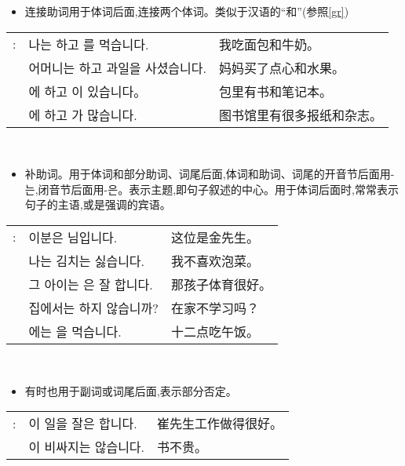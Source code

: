 \begin{grammar}
    \begin{grammarsect}[\kr -하고]
    \begin{itemize}
        \item 连接助词用于体词后面,连接两个体词。类似于汉语的“和”(参照\ref{gr})
    \end{itemize}
    \begin{tabular}{lll}
        \kr \ruby{例}{예}: &\kr 나는 \ruby{빵}{pão}하고 \ruby{牛乳}{우유}를 먹습니다.&我吃面包和牛奶。 \\
        &\kr 어머니는 \ruby{菓子}{과자}하고 과일을 사셨습니다. &妈妈买了点心和水果。\\ 
        &\kr \ruby{가방}{かばん}에 \ruby{冊}{책}하고 \ruby{空冊}{공책}이 있습니다。&包里有书和笔记本。\\
        &\kr \ruby{圖書館}{도서관}에 \ruby{新聞}{신문}하고 \ruby{雜誌}{잡지}가 많습니다.&图书馆里有很多报纸和杂志。\\
    \end{tabular}\\
    \end{grammarsect}
    \begin{grammarsect}[\kr -은/-는]
        \begin{itemize}
            \item 补助词。用于体词和部分助词、词尾后面,体词和助词、词尾的开音节后面用{\kr -는},闭音节后面用{\kr -은}。表示主题,即句子叙述的中心。用于体词后面时,常常表示句子的主语,或是强调的宾语。
        \end{itemize}
        \begin{tabular}{lll}
            \kr \ruby{例}{예}: &\kr 이분은 \ruby{金}{김} \ruby{先生}{선생}님입니다.&这位是金先生。\\
            &\kr 나는 김치는 싫습니다.&我不喜欢泡菜。\\
            &\kr 그 아이는 \ruby{運動}{운동}은 잘 합니다.&那孩子体育很好。\\
            &\kr 집에서는 \ruby{工夫}{공부}하지 않습니까?&在家不学习吗？\\
            &\kr \ruby{/2}{열두}\ruby{時}{시}에는 \ruby{點心}{점심}을 먹습니다.&十二点吃午饭。
        \end{tabular}\\
        \begin{itemize}
            \item 有时也用于副词或词尾后面,表示部分否定。
        \end{itemize}
        \begin{tabular}{lll}
            \kr \ruby{例}{예}: &\kr \ruby{崔}{최} \ruby{先生}{선생}이 일을 잘은 합니다.&崔先生工作做得很好。\\
            &\kr \ruby{冊}{책}이 비싸지는 않습니다.&书不贵。
        \end{tabular}\\
    \end{grammarsect}
\end{grammar}
